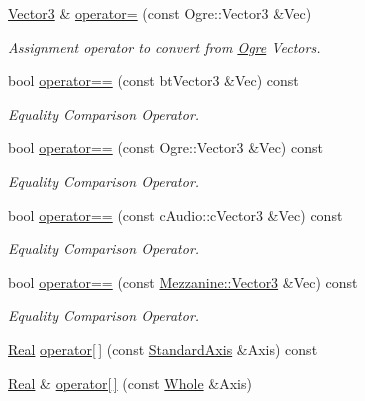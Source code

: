 \begin{DoxyCompactItemize}
\hyperlink{classMezzanine_1_1Vector3}{Vector3} \& \hyperlink{classMezzanine_1_1Vector3_aa5f656c70691a0341ea7b25e70fcde90}{operator=} (const Ogre::Vector3 \&Vec)
\begin{DoxyCompactList}\small\item\em Assignment operator to convert from \hyperlink{namespaceOgre}{Ogre} Vectors. \item\end{DoxyCompactList}\item 
bool \hyperlink{classMezzanine_1_1Vector3_a1689523b98fe6ec2ffdda1a0f927945c}{operator==} (const btVector3 \&Vec) const 
\begin{DoxyCompactList}\small\item\em Equality Comparison Operator. \item\end{DoxyCompactList}\item 
bool \hyperlink{classMezzanine_1_1Vector3_a3dc4329b6936634d248210924a5f3d34}{operator==} (const Ogre::Vector3 \&Vec) const 
\begin{DoxyCompactList}\small\item\em Equality Comparison Operator. \item\end{DoxyCompactList}\item 
bool \hyperlink{classMezzanine_1_1Vector3_a528d444d3de6725449093ea205e37323}{operator==} (const cAudio::cVector3 \&Vec) const 
\begin{DoxyCompactList}\small\item\em Equality Comparison Operator. \item\end{DoxyCompactList}\item 
bool \hyperlink{classMezzanine_1_1Vector3_a5404f12b72f25712c37b20a302379ca4}{operator==} (const \hyperlink{classMezzanine_1_1Vector3}{Mezzanine::Vector3} \&Vec) const 
\begin{DoxyCompactList}\small\item\em Equality Comparison Operator. \item\end{DoxyCompactList}\item 
\hyperlink{namespaceMezzanine_a726731b1a7df72bf3583e4a97282c6f6}{Real} \hyperlink{classMezzanine_1_1Vector3_a8682131457fb99200751476bf98cd85a}{operator\mbox{[}$\,$\mbox{]}} (const \hyperlink{namespaceMezzanine_ab41a00a8c6a47b576dc987ec34e16ba1}{StandardAxis} \&Axis) const 
\item 
\hyperlink{namespaceMezzanine_a726731b1a7df72bf3583e4a97282c6f6}{Real} \& \hyperlink{classMezzanine_1_1Vector3_ae0b3bf9876d3c7da3e86e17ccf46206f}{operator\mbox{[}$\,$\mbox{]}} (const \hyperlink{namespaceMezzanine_adcbb6ce6d1eb4379d109e51171e2e493}{Whole} \&Axis)

\end{DoxyCompactItemize}
